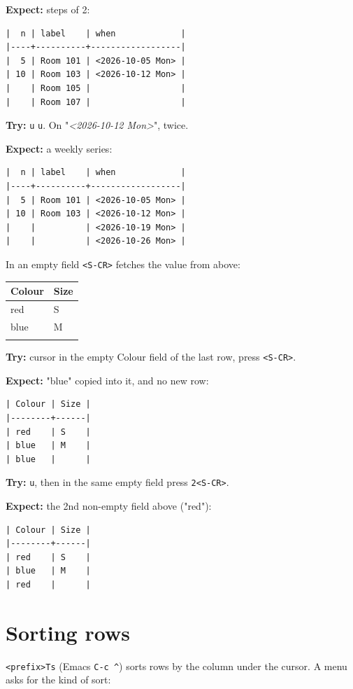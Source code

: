 \textbf{Expect:} steps of 2:
\begin{verbatim}
|  n | label    | when             |
|----+----------+------------------|
|  5 | Room 101 | <2026-10-05 Mon> |
| 10 | Room 103 | <2026-10-12 Mon> |
|    | Room 105 |                  |
|    | Room 107 |                  |
\end{verbatim}

\textbf{Try:} \texttt{u} \texttt{u}. On "\textit{<2026-10-12 Mon>}", twice.

\textbf{Expect:} a weekly series:
\begin{verbatim}
|  n | label    | when             |
|----+----------+------------------|
|  5 | Room 101 | <2026-10-05 Mon> |
| 10 | Room 103 | <2026-10-12 Mon> |
|    |          | <2026-10-19 Mon> |
|    |          | <2026-10-26 Mon> |
\end{verbatim}

In an empty field \texttt{<S-CR>} fetches the value from above:

\begin{table}[htbp]
\label{tab:org9c43852}
\centering
\begin{tabular}{ll}
Colour & Size\\
\hline
red & S\\
blue & M\\
 & \\
\end{tabular}
\end{table}

\textbf{Try:} cursor in the empty Colour field of the last row, press \texttt{<S-CR>}.

\textbf{Expect:} "blue" copied into it, and no new row:
\begin{verbatim}
| Colour | Size |
|--------+------|
| red    | S    |
| blue   | M    |
| blue   |      |
\end{verbatim}

\textbf{Try:} \texttt{u}, then in the same empty field press \texttt{2<S-CR>}.

\textbf{Expect:} the 2nd non-empty field above ("red"):
\begin{verbatim}
| Colour | Size |
|--------+------|
| red    | S    |
| blue   | M    |
| red    |      |
\end{verbatim}
\section{Sorting rows}
\label{sec:orgd22997b}
\texttt{<prefix>Ts} (Emacs \texttt{C-c \textasciicircum{}}) sorts rows by the column under the cursor.
A menu asks for the kind of sort:

